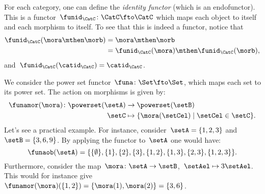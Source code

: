 \begin{example}
  For each category, one can define the \emph{identity functor} (which is an endofunctor).
  This is a functor~$\funid_\CatC \colon \CatC \fto \CatC$ which maps each object to itself and each morphism to itself.
  To see that this is indeed a functor, notice that
  \begin{equation*}
  \begin{aligned}
    \funid_\CatC(\mora \mthen \morb)&=\mora \mthen \morb\\
    &=\funid_\CatC(\mora)\mthen \funid_\CatC(\morb),
  \end{aligned}
  \end{equation*}
    and~$\funid_\CatC(\catid_\CatC)=\catid_\CatC$.
\end{example}

\begin{example}
  \label{ex:powerset_functor}
  We consider the power set functor~$\funa\colon \Set \fto \Set$, which maps each set to its power set.
  The action on morphisms is given by:
  \begin{equation*}
  \begin{aligned}
    \funamor(\mora)\colon \powerset(\setA)&\to \powerset(\setB)\\
    \setC&\mapsto \{\mora(\setCel) \mid \setCel \in \setC\}.
  \end{aligned}
  \end{equation*}
  Let's see a practical example.
  For instance, consider~$\setA=\{1,2,3\}$ and~$\setB=\{3,6,9\}$. By applying the functor to~$\setA$ one would have:
  \begin{equation*}
    \funaob(\setA)=\{\{\emptyset\}, \{1\}, \{2\}, \{3\}, \{1,2\}, \{1,3\}, \{2,3\}, \{1,2,3\}\}.
  \end{equation*}
  Furthermore, consider the map~$\mora\colon \setA\to \setB$,~$\setAel\mapsto 3\setAel$.
  This would for instance give~$\funamor(\mora)(\{1,2\})=\{\mora(1),\mora(2)\}=\{3,6\}$.


\end{example}
